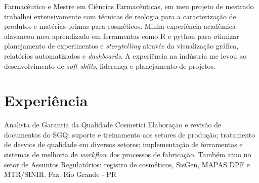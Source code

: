 
\begin{center}
    \small
        Farmacêutico e Mestre em Ciências Farmacêuticas, em meu projeto de mestrado trabalhei extensivamente com técnicas
        de reologia para a caracterização de produtos e matérias-primas para cosméticos.
        Minha experiência acadêmica alavancou meu aprendizado em ferramentas como R e python para otimizar planejamento
        de experimentos e \emph{storytelling} através da visualização gráfica, relatórios automatizados e \emph{dashboards}.
        A experiência na indústria me levou ao desenvolvimento de \emph{soft skills}, liderança e planejamento de projetos.
\end{center}
    
\section{Experiência}



{Analista de Garantia da Qualidade}
{Cosmetici}
{
    Elaboraçao e revisão de documentos do SGQ;
    suporte e treinamento aos setores de produção;
    tratamento de desvios de qualidade em diversos setores;
    implementação de ferramentas e sistemas de melhoria de \emph{workflow}
    dos processos de fabricação.
    Também atuo no setor de Assuntos Regulatórios:
    registro de cosméticos, SisGen, MAPAS DPF e MTR/SINIR.
}
{Faz. Rio Grande - PR}








